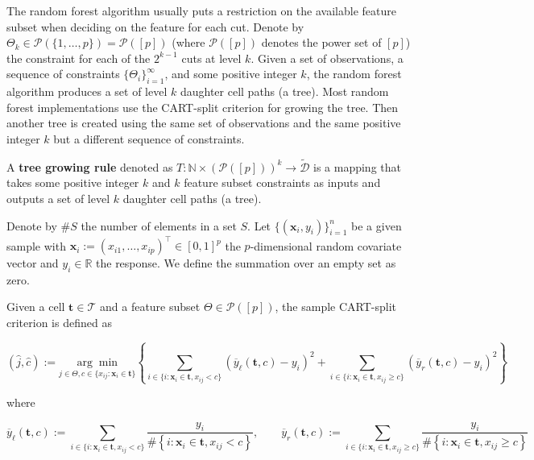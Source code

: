The random forest algorithm usually puts a restriction on the available feature subset when deciding on the feature for each cut. Denote by \(\Theta_k \in \mathcal{P}\left(\{1, \ldots, p\}\right) = \mathcal{P}\left( [p]\right)\) (where \(\mathcal{P}\left( [p]\right)\) denotes the power set of \([p]\)) the constraint for each of the \(2^{k-1}\) cuts at level \(k\). Given a set of observations, a sequence of constraints \(\{\Theta_i\}_{i=1}^\infty\), and some positive integer \(k\), the random forest algorithm produces a set of level \(k\) daughter cell paths (a tree). Most random forest implementations use the CART-split criterion for growing the tree. Then another tree is created using the same set of observations and the same positive integer \(k\) but a different sequence of constraints. 

\begin{definition}

A \textbf{tree growing rule} denoted as \(T:   \mathbb{N} \times \left( \mathcal{P}\left( [p]\right) \right)^k \to \tilde{\mathcal{D}}\) is a mapping that takes some positive integer \(k\) and \(k\) feature subset constraints as inputs and outputs a set of level \(k\) daughter cell paths (a tree).

\end{definition}

Denote by \(\# S\) the number of elements in a set \(S\). Let \(\{(\boldsymbol{x}_i, y_i) \}_{i=1}^n\) be a given sample with \(\boldsymbol{x}_i := (x_{i1}, \ldots, x_{ip})^\top \in [0, 1]^{p}\) the \(p\)-dimensional random covariate vector and \(y_i \in \mathbb{R}\) the response. We define the summation over an empty set as zero. 

\begin{definition}

Given a cell \(\boldsymbol{t} \in \mathcal{T}\) and a feature subset \(\Theta \in \mathcal{P}\left( [p]\right)\), the sample CART-split criterion is defined as

\[
(\hat{j}, \hat{c}) := \underset{j \in \Theta, c\in\{x_{ij}: \boldsymbol{x}_i \in \boldsymbol{t}\}}{\arg \min}\left\{ \sum_{i \in \{i: \boldsymbol{x}_i \in \boldsymbol{t}, x_{ij} < c\}} \left( \overline{y}_\ell(\boldsymbol{t}, c) - y_i\right)^2 + \sum_{i \in \{i: \boldsymbol{x}_i \in \boldsymbol{t}, x_{ij} \geq c\}} \left( \overline{y}_r(\boldsymbol{t}, c) - y_i\right)^2  \right\}
\]

where

\[
\overline{y}_\ell(\boldsymbol{t}, c) := \sum_{i \in \{i: \boldsymbol{x}_i \in \boldsymbol{t}, x_{ij} < c\}} \frac{y_i}{\# \left\{i: \boldsymbol{x}_i \in \boldsymbol{t}, x_{ij} < c \right\}}, \qquad \overline{y}_r(\boldsymbol{t}, c) := \sum_{i \in \{i: \boldsymbol{x}_i \in \boldsymbol{t}, x_{ij} \geq c\}} \frac{y_i}{\# \left\{i: \boldsymbol{x}_i \in \boldsymbol{t}, x_{ij} \geq c \right\}}
\]

\end{definition}

